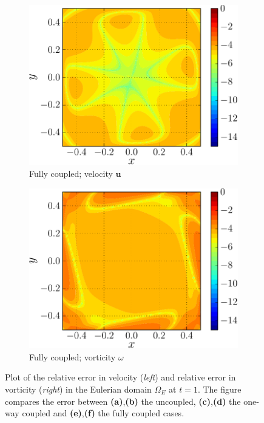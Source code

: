 \begin{figure}[!p]
     \begin{subfigure}[t]{0.45\textwidth}
             \includegraphics[width=\linewidth]{./figures/hybrid/lambOseent2/lambOseen_fully_vErrorFinal_compressed-crop.pdf}
             \caption{Fully coupled; velocity $\mathbf{u}$}
             \label{fig:lambOseen_fully_vErrorFinal}
     \end{subfigure}     
     \qquad
     \begin{subfigure}[t]{0.45\textwidth}
             \includegraphics[width=\linewidth]{./figures/hybrid/lambOseent2/lambOseen_fully_wErrorFinal_compressed-crop.pdf}
             \caption{Fully coupled; vorticity $\omega$}
             \label{fig:lambOseen_fully_wErrorFinal}
     \end{subfigure}        
     
     \caption{Plot of the relative error in velocity (\textit{left}) and relative error in vorticity (\textit{right}) in the Eulerian domain $\Omega_E$ at $t=1$. The figure compares the error between \textbf{(a)},\textbf{(b)} the uncoupled, \textbf{(c)},\textbf{(d)} the one-way coupled and \textbf{(e)},\textbf{(f)} the fully coupled cases.}
     \label{fig:lambOseen_finalError}
	\end{figure}

